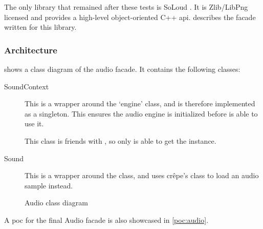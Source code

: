 \documentclass{projdoc}
\begin{document}
The only library that remained after these tests is SoLoud \autocite{lib:soloud}. It
is Zlib/LibPng licensed and provides a high-level object-oriented C++ \gls{api}.
 describes the \gls{facade} written for this library.

\subsubsection{Architecture}
\label{sec:audio:architecture}

 shows a class diagram of the audio \gls{facade}. It
contains the following classes:
\begin{description}
	\item[SoundContext] This is a wrapper around the 
		`engine' class, and is therefore implemented as a singleton. This ensures the
		audio engine is initialized before  is able to use it.

		This class is friends with , so only  is able
		to get the  instance.
	\item[Sound] This is a wrapper around the  class, and uses
		cr\^epe's  class to load an audio sample instead.
\end{description}

\begin{figure}
	\centering
	\caption{Audio  class diagram}
	\label{fig:class-audio-facade}
\end{figure}

A \gls{poc} for the final Audio \gls{facade} is also showcased in \cref{poc:audio}.
\end{document}
